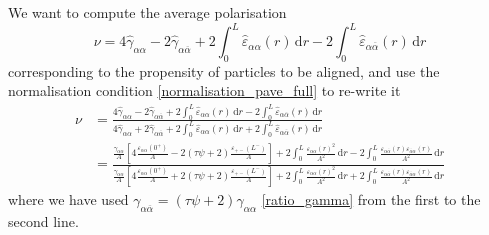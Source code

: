 \documentclass[pre,aps,superscriptaddress,nofootinbib]{revtex4}
\begin{document}
We want to compute the average polarisation
\begin{equation}
\nu = 4 \hat{\gamma}_{\alpha\alpha} - 2 \hat{\gamma}_{\alpha\overline{\alpha}} + 2 \int_0^L \hat{\varepsilon}_{\alpha\alpha}(r) \, \mathrm{d}r - 2 \int_0^L \hat{\varepsilon}_{\alpha\overline{\alpha}}(r) \, \mathrm{d}r
\label{nu_pave}
\end{equation}
corresponding to the propensity of particles to be aligned, and use the normalisation condition \eqref{normalisation_pave_full} to re-write it
\begin{equation}
\begin{aligned}
\nu &= \frac{4 \hat{\gamma}_{\alpha\alpha} - 2 \hat{\gamma}_{\alpha\overline{\alpha}} + 2 \int_0^L \hat{\varepsilon}_{\alpha\alpha}(r) \, \mathrm{d}r - 2 \int_0^L \hat{\varepsilon}_{\alpha\overline{\alpha}}(r) \, \mathrm{d}r}{4 \hat{\gamma}_{\alpha\alpha} + 2 \hat{\gamma}_{\alpha\overline{\alpha}} + 2 \int_0^L \hat{\varepsilon}_{\alpha\alpha}(r) \, \mathrm{d}r + 2 \int_0^L \hat{\varepsilon}_{\alpha\overline{\alpha}}(r) \, \mathrm{d}r}\\
&= \frac{\frac{\gamma_{\alpha\alpha}}{A} \left[4 \frac{\varepsilon_{\alpha\alpha}(0^+)}{A} - 2 (\tau \psi + 2) \frac{\varepsilon_{+-}(L^-)}{A}\right] + 2 \int_0^L \frac{\varepsilon_{\alpha\alpha}(r)^2}{A^2} \, \mathrm{d}r - 2 \int_0^L \frac{\varepsilon_{\alpha\overline{\alpha}}(r)\varepsilon_{\overline{\alpha}\alpha}(r)}{A^2} \, \mathrm{d}r}{\frac{\gamma_{\alpha\alpha}}{A} \left[4 \frac{\varepsilon_{\alpha\alpha}(0^+)}{A} + 2 (\tau \psi + 2) \frac{\varepsilon_{+-}(L^-)}{A}\right] + 2 \int_0^L \frac{\varepsilon_{\alpha\alpha}(r)^2}{A^2} \, \mathrm{d}r + 2 \int_0^L \frac{\varepsilon_{\alpha\overline{\alpha}}(r)\varepsilon_{\overline{\alpha}\alpha}(r)}{A^2} \, \mathrm{d}r}
\end{aligned}
\end{equation}
where we have used $\gamma_{\alpha\overline{\alpha}} = (\tau \psi + 2) \gamma_{\alpha\alpha}$ \eqref{ratio_gamma} from the first to the second line.\\
\end{document}
